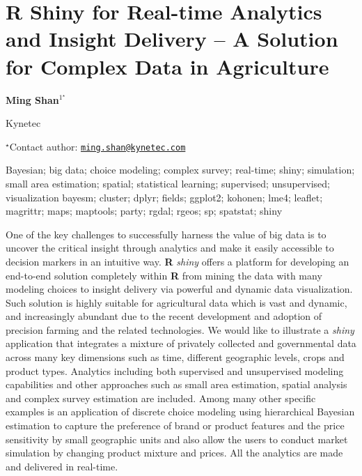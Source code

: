 \documentclass[\main/boa.tex]{subfiles}
\begin{document}
\section{R Shiny for Real-time Analytics and Insight Delivery -- A Solution for
Complex Data in Agriculture}

\begin{center}
  {\bf Ming Shan$^{1^\star}$}
\end{center}

\vskip 0.3cm

\begin{affiliations}
\begin{enumerate}
\begin{minipage}{0.915\textwidth}
\centering
\item Kynetec \\[-2pt]
\end{minipage}
\end{enumerate}
$^\star$Contact author: \href{mailto:ming.shan@kynetec.com}{\nolinkurl{ming.shan@kynetec.com}}\\
\end{affiliations}

\vskip 0.5cm

\begin{minipage}{0.915\textwidth}
\keywords Bayesian; big data; choice modeling; complex survey; real-time; shiny;
simulation; small area estimation; spatial; statistical learning;
supervised; unsupervised; visualization
\packages bayesm; cluster; dplyr; fields; ggplot2; kohonen; lme4; leaflet;
magrittr; maps; maptools; party; rgdal; rgeos; sp; spatstat; shiny
\end{minipage}

\vskip 0.8cm

One of the key challenges to successfully harness the value of big data
is to uncover the critical insight through analytics and make it easily
accessible to decision markers in an intuitive way. \textbf{R}
\emph{shiny} offers a platform for developing an end-to-end solution
completely within \textbf{R} from mining the data with many modeling
choices to insight delivery via powerful and dynamic data visualization.
Such solution is highly suitable for agricultural data which is vast and
dynamic, and increasingly abundant due to the recent development and
adoption of precision farming and the related technologies. We would
like to illustrate a \emph{shiny} application that integrates a mixture
of privately collected and governmental data across many key dimensions
such as time, different geographic levels, crops and product types.
Analytics including both supervised and unsupervised modeling
capabilities and other approaches such as small area estimation, spatial
analysis and complex survey estimation are included. Among many other
specific examples is an application of discrete choice modeling using
hierarchical Bayesian estimation to capture the preference of brand or
product features and the price sensitivity by small geographic units and
also allow the users to conduct market simulation by changing product
mixture and prices. All the analytics are made and delivered in
real-time.
\end{document}
